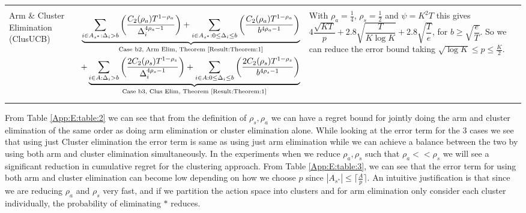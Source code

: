 \begin{table}
\begin{center}
\begin{tabular}{p{1.4cm}p{10.3cm}p{3.5cm}}
\hline\\
Arm \& Cluster Elimination (ClusUCB) 	& \begin{align*}  \underbrace{\sum_{i\in A_{s^{*}}:\Delta_{i} > b}\bigg(\dfrac{C_{2}(\rho_{a})T^{1-\rho_{a}}}{\Delta_{i}^{4\rho_{a}-1}} \bigg)+ \sum_{i\in A_{s^{*}}:0\leq\Delta_{i}\leq b}\bigg(\dfrac{C_{2}(\rho_{a})T^{1-\rho_{a}}}{b^{4\rho_{a} -1}} \bigg)}_{\text{Case b2, Arm Elim, Theorem \ref{Result:Theorem:1}}}\\   
 + \underbrace{\sum_{i\in A:\Delta_{i} > b}\bigg(\dfrac{2C_{2}(\rho_{s})T^{1-\rho_{s}}}{\Delta_{i}^{4\rho_{s}-1}} \bigg)+ \sum_{i\in A:0\leq\Delta_{i}\leq b}\bigg(\dfrac{2C_{2}(\rho_{s})T^{1-\rho_{s}}}{b^{4\rho_{s} -1}} \bigg)}_{\text{Case b3, Clus Elim, Theorem \ref{Result:Theorem:1}}} \end{align*} & With $\rho_{a}=\frac{1}{4}$, $\rho_{s}=\frac{1}{2}$ and $\psi=K^{2}T$ this gives $4\dfrac{\sqrt{KT}}{p} + 2.8\sqrt{\dfrac{T}{K\log K}} + 2.8\sqrt{\dfrac{T}{e}}$, for $b\geq \sqrt{\dfrac{e}{T}}$. So we can reduce the error bound taking $\sqrt{\log K}\leq p\leq \frac{K}{2}$. 
\end{tabular}
\end{center}	
\end{table}
 From Table \ref{App:E:table:2} we can see that from the definition of $\rho_{s},\rho_{a}$ we can have a regret bound for jointly doing the arm and cluster elimination of the same order as doing arm elimination or cluster elimination alone. While looking at the error term for the $3$ cases we see that using just Cluster elimination the error term is  same as using just arm elimination while we can achieve a balance between the two by using both arm and cluster  elimination simultaneously. In the experiments when we reduce $\rho_{a}, \rho_{s}$ such that $\rho_{a}<<\rho_{s}$ we will see a significant reduction in cumulative regret for the clustering approach. From Table \ref{App:E:table:3}, we can see that the error term for using both arm and cluster elimination can become low depending on how we choose $p$ since $|A_{s^{*}}|\leq \lceil\frac{A}{p}\rceil$. An intuitive justification is that since we are reducing $\rho_{a}$ and $\rho_{s}$ very fast, and if we partition the action space into clusters and for arm elimination only consider each cluster individually, the probability of eliminating ${*}$ reduces. 

